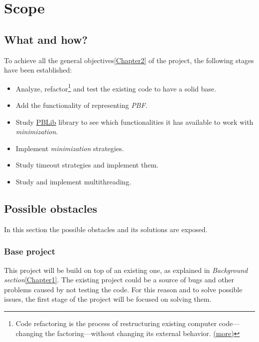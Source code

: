 \chapter{Scope} %

\label{Chapter3} %

\section{What and how?}

To achieve all the general objectives\ref{Chapter2} of the project, the following stages have been established:
\begin{itemize}
	\item Analyze, refactor\footnote{Code refactoring is the process of restructuring existing computer code—changing the factoring—without changing its external behavior. \href{https://en.wikipedia.org/wiki/Code_refactoring}{(more)}} and test the existing code to have a solid base. 
	\item Add the functionality of representing \emph{PBF}.
	\item Study \href{http://tools.computational-logic.org/content/pblib.php}{PBLib} library to see which functionalities it has available to work with \emph{minimization}.
	\item Implement \emph{minimization} strategies.
	\item Study timeout strategies and implement them.
	\item Study and implement multithreading.
\end{itemize}

\section{Possible obstacles}

In this section the possible obstacles and its solutions are exposed.

\subsection{Base project}
This project will be build on top of an existing one, as explained in \emph{Background section}\ref{Chapter1}. The existing project could be a source of bugs and other problems caused by not testing the code. For this reason and to solve possible issues, the first stage of the project will be focused on solving them.
